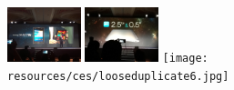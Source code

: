 \documentclass{acm_proc_article-sp}
\newcommand{\thumbheight}{16mm}
\newenvironment{thumbsequence}{}{\makebox[4mm]{}}
\begin{document}
\begin{figure}
\begin{centering}
\begin{thumbsequence}
		\includegraphics[height=\thumbheight]{resources/ces/looseduplicate4.jpg}
		\includegraphics[height=\thumbheight]{resources/ces/looseduplicate5.jpg}
	\end{thumbsequence}
	\begin{thumbsequence}
		\texttt{[image: resources/ces/looseduplicate6.jpg]}

\end{thumbsequence}
\end{centering}
\end{figure}
\end{document}
